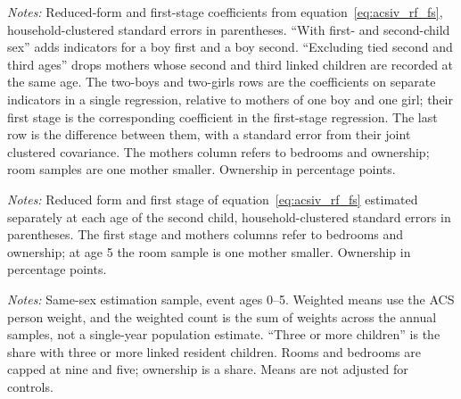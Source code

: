 \begin{table}[htbp]
\centering
\footnotesize
\caption{Same-sex design: alternative specifications, event ages 0--5}
\label{tab:acsiv_diag_specs}

\par\medskip
\begin{minipage}{0.97\linewidth}
\footnotesize\textit{Notes:} Reduced-form and first-stage coefficients from
equation~\eqref{eq:acsiv_rf_fs}, household-clustered standard errors in
parentheses. ``With first- and second-child sex'' adds indicators for a boy first
and a boy second. ``Excluding tied second and third ages'' drops mothers whose
second and third linked children are recorded at the same age. The two-boys and
two-girls rows are the coefficients on separate indicators in a single regression,
relative to mothers of one boy and one girl; their first stage is the corresponding
coefficient in the first-stage regression. The last row is the difference between
them, with a standard error from their joint clustered covariance. The mothers
column refers to bedrooms and ownership; room samples are one mother smaller.
Ownership in percentage points.
\end{minipage}
\end{table}

\begin{table}[htbp]
\centering
\footnotesize
\caption{Same-sex design by age of the second child}
\label{tab:acsiv_diag_ages}

\par\medskip
\begin{minipage}{0.97\linewidth}
\footnotesize\textit{Notes:} Reduced form and first stage of
equation~\eqref{eq:acsiv_rf_fs} estimated separately at each age of the second
child, household-clustered standard errors in parentheses. The first stage and
mothers columns refer to bedrooms and ownership; at age 5 the room sample is one
mother smaller. Ownership in percentage points.
\end{minipage}
\end{table}

\begin{table}[htbp]
\centering
\footnotesize
\caption{Same-sex design: means by sex of the two oldest children}
\label{tab:acsiv_diag_cells}

\par\medskip
\begin{minipage}{0.97\linewidth}
\footnotesize\textit{Notes:} Same-sex estimation sample, event ages 0--5. Weighted
means use the ACS person weight, and the weighted count is the sum of weights
across the annual samples, not a single-year population estimate.
``Three or more children'' is the share with three or more linked resident children.
Rooms and bedrooms are capped at nine and five; ownership is a share. Means are not
adjusted for controls.
\end{minipage}
\end{table}

